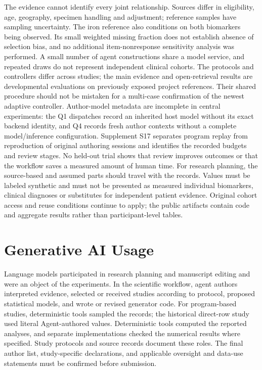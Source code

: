 \documentclass[11pt,letterpaper]{article}
\begin{document}
The evidence cannot identify every joint relationship. Sources differ in eligibility, age, geography, specimen handling and adjustment; reference samples have sampling uncertainty. The iron reference also conditions on both biomarkers being observed. Its small weighted missing fraction does not establish absence of selection bias, and no additional item-nonresponse sensitivity analysis was performed. A small number of agent constructions share a model service, and repeated draws do not represent independent clinical cohorts. The protocols and controllers differ across studies; the main evidence and open-retrieval results are developmental evaluations on previously exposed project references. Their shared procedure should not be mistaken for a multi-case confirmation of the newest adaptive controller. Author-model metadata are incomplete in central experiments: the Q1 dispatches record an inherited host model without its exact backend identity, and Q4 records fresh author contexts without a complete model/\allowbreak{}inference configuration. Supplement S17 separates program replay from reproduction of original authoring sessions and identifies the recorded budgets and review stages. No held-out trial shows that review improves outcomes or that the workflow saves a measured amount of human time. For research planning, the source-based and assumed parts should travel with the records. Values must be labeled synthetic and must not be presented as measured individual biomarkers, clinical diagnoses or substitutes for independent patient evidence. Original cohort access and reuse conditions continue to apply; the public artifacts contain code and aggregate results rather than participant-level tables.


\section{Generative AI Usage}

Language models participated in research planning and manuscript editing and were an object of the experiments. In the scientific workflow, agent authors interpreted evidence, selected or received studies according to protocol, proposed statistical models, and wrote or revised generator code. For program-based studies, deterministic tools sampled the records; the historical direct-row study used literal Agent-authored values. Deterministic tools computed the reported analyses, and separate implementations checked the numerical results where specified. Study protocols and source records document these roles. The final author list, study-specific declarations, and applicable oversight and data-use statements must be confirmed before submission.
\end{document}
